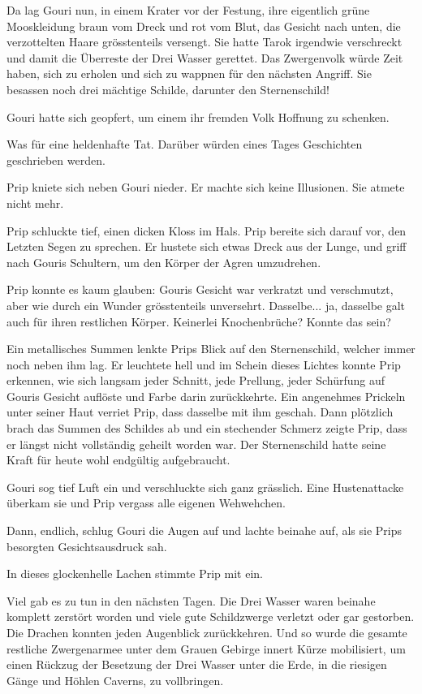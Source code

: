 Da lag Gouri nun, in einem Krater vor der Festung, ihre eigentlich grüne Mooskleidung braun vom Dreck und rot vom Blut, das Gesicht nach unten, die verzottelten Haare grösstenteils versengt. Sie hatte Tarok irgendwie verschreckt und damit die Überreste der Drei Wasser gerettet. Das Zwergenvolk würde Zeit haben, sich zu erholen und sich zu wappnen für den nächsten Angriff. Sie besassen noch drei mächtige Schilde, darunter den Sternenschild!

Gouri hatte sich geopfert, um einem ihr fremden Volk Hoffnung zu schenken.

Was für eine heldenhafte Tat. Darüber würden eines Tages Geschichten geschrieben werden.

Prip kniete sich neben Gouri nieder. Er machte sich keine Illusionen. Sie atmete nicht mehr.

Prip schluckte tief, einen dicken Kloss im Hals. Prip bereite sich darauf vor, den Letzten Segen zu sprechen. Er hustete sich etwas Dreck aus der Lunge, und griff nach Gouris Schultern, um den Körper der Agren umzudrehen.

Prip konnte es kaum glauben: Gouris Gesicht war verkratzt und verschmutzt, aber wie durch ein Wunder grösstenteils unversehrt. Dasselbe... ja, dasselbe galt auch für ihren restlichen Körper. Keinerlei Knochenbrüche? Konnte das sein?

Ein metallisches Summen lenkte Prips Blick auf den Sternenschild, welcher immer noch neben ihm lag. Er leuchtete hell und im Schein dieses Lichtes konnte Prip erkennen, wie sich langsam jeder Schnitt, jede Prellung, jeder Schürfung auf Gouris Gesicht auflöste und Farbe darin zurückkehrte. Ein angenehmes Prickeln unter seiner Haut verriet Prip, dass dasselbe mit ihm geschah. Dann plötzlich brach das Summen des Schildes ab und ein stechender Schmerz zeigte Prip, dass er längst nicht vollständig geheilt worden war. Der Sternenschild hatte seine Kraft für heute wohl endgültig aufgebraucht.

Gouri sog tief Luft ein und verschluckte sich ganz grässlich. Eine Hustenattacke überkam sie und Prip vergass alle eigenen Wehwehchen.

Dann, endlich, schlug Gouri die Augen auf und lachte beinahe auf, als sie Prips besorgten Gesichtsausdruck sah.

In dieses glockenhelle Lachen stimmte Prip mit ein.



\trennzeichen



Viel gab es zu tun in den nächsten Tagen. Die Drei Wasser waren beinahe komplett zerstört worden und viele gute Schildzwerge verletzt oder gar gestorben. Die Drachen konnten jeden Augenblick zurückkehren. Und so wurde die gesamte restliche Zwergenarmee unter dem Grauen Gebirge innert Kürze mobilisiert, um einen Rückzug der Besetzung der Drei Wasser unter die Erde, in die riesigen Gänge und Höhlen Caverns, zu vollbringen.

